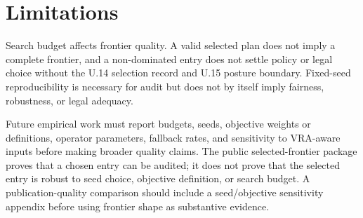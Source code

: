 \section{Limitations}

Search budget affects frontier quality. A valid selected plan does not imply a
complete frontier, and a non-dominated entry does not settle policy or legal
choice without the U.14 selection record and U.15 posture boundary.
Fixed-seed reproducibility is necessary for audit but does not by itself imply
fairness, robustness, or legal adequacy.

Future empirical work must report budgets, seeds, objective weights or
definitions, operator parameters, fallback rates, and sensitivity to VRA-aware
inputs before making broader quality claims.
The public selected-frontier package proves that a chosen entry can be audited;
it does not prove that the selected entry is robust to seed choice, objective
definition, or search budget. A publication-quality comparison should include a
seed/objective sensitivity appendix before using frontier shape as substantive
evidence.
